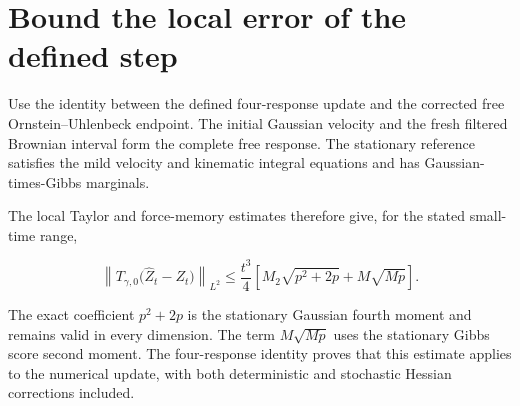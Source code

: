 \documentclass[11pt,a4paper]{article}
\begin{document}
\section{\texorpdfstring{Bound the local error of the defined step}{Bound the local error of the defined step}}


Use the identity between the defined four-response update and the corrected free Ornstein–Uhlenbeck endpoint. The initial Gaussian velocity and the fresh filtered Brownian interval form the complete free response. The stationary reference satisfies the mild velocity and kinematic integral equations and has Gaussian-times-Gibbs marginals.



The local Taylor and force-memory estimates therefore give, for the stated small-time range,

\[\left\|T_{\gamma,0}\bigl(\widehat Z_t-Z_t\bigr)\right\|_{L^2}\le\frac{t^3}{4}\left[M_2\sqrt{p^2+2p}+M\sqrt{Mp}\right].\]

The exact coefficient \(p^2+2p\) is the stationary Gaussian fourth moment and remains valid in every dimension. The term \(M\sqrt{Mp}\) uses the stationary Gibbs score second moment. The four-response identity proves that this estimate applies to the numerical update, with both deterministic and stochastic Hessian corrections included.
\end{document}
